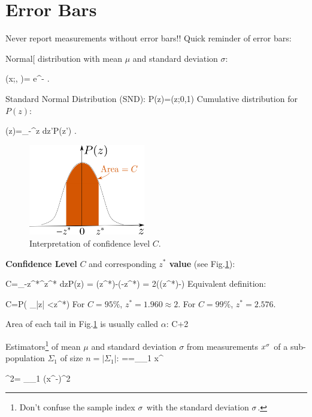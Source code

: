 \section{Error Bars}
Never report measurements without error bars!!
Quick reminder of error bars:

Normal[ distribution
with mean $\mu$
and standard deviation $\sigma$:

\beq
\caln(x;\mu, \sigma)=
e^{- }
\;.
\eeq

Standard Normal Distribution (SND):
\beq
P(z)=\caln(z;0,1)
\eeq
Cumulative distribution for $P(z)$:

\beq
\Phi(z)=\int_{-\infty}^z dz'\;P(z')
\;.
\eeq

\begin{figure}[h!]
\centering
\includegraphics[width=2in]
{conventions/error-bars.png}
\caption{
Interpretation
of confidence level $C$.} 
\label{fig-error-bars}
\end{figure}

{\bf Confidence Level} $C$
and corresponding {\bf $z^*$ value}
(see Fig.\ref{fig-error-bars}):

\beq
C=\int_{-z^*}^{z^*} dz\;P(z) = 
\Phi(z^*)-\Phi(-z^*)
=
2\left(\Phi(z^*)-\right)
\label{eq-conf-level1}
\eeq
Equivalent definition:

\beq
C=P\left(
_{|z|}
<z^*\right)
\label{eq-conf-level2}
\eeq
For $C=95\%$,
$z^*=1.960\approx 2$.
For $C=99\%$, $z^*=2.576$.

Area of each tail 
in Fig.\ref{fig-error-bars} is
usually called $\alpha$:
\beq
C+2
\eeq  

Estimators\footnote{Don't 
confuse the sample index $\sigma$
with the standard deviation $\sigma$.} of 
mean $\mu$  and 
standard deviation $\sigma$
from measurements $x^\sigma$
of a sub-population $\Sigma_1$ of
size $n=|\Sigma_1|$:
\beq
\hat{\mu}==\sum_{\s \in\Sigma_1} x^\s
\eeq

\beq
\hat{\s}^2=
\sum_{\s\in \Sigma_1} (x^\s-)^2
\eeq


